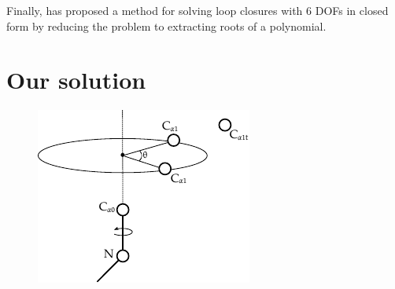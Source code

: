 Finally, \cite{wedemeyer1999exact} has proposed a method for solving loop closures with 6 DOFs in closed form by reducing the problem to extracting roots of a polynomial.


\section{Our solution}





\begin{figure}
  \centering
	\includegraphics[width=0.75\columnwidth]{figures/ccd_angles}
	\label{fig:ccd_angles}
  \caption{}
\end{figure}

